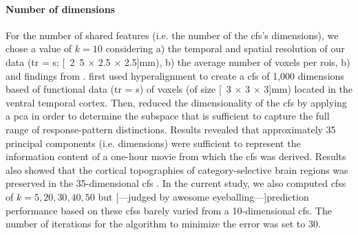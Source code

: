 \paragraph{Number of dimensions}


%
%

For the number of shared features (i.e. the number of the \ac{cfs}'s
dimensions), we chose a value of $k=10$ considering a) the temporal and spatial
resolution of our data (\ac{tr} = \unit[2]{s}; \unit[2.5 $\times$ 2.5 $\times$
2.5]{mm}), b) the average number of voxels per \acp{roi}, b) and findings from
\citet{haxby2011common}.
%
\citet{haxby2011common} first used hyperalignment to create a \ac{cfs} of 1,000
dimensions based of functional data (\ac{tr} = \unit[3]{s}) of voxels (of size
\unit[3 $\times$ 3 $\times$ 3]{mm}) located in the ventral temporal cortex.
%
Then, \citet{haxby2011common} reduced the dimensionality of the \ac{cfs} by
applying a \ac{pca} in order to determine the subspace that is sufficient to
capture the full range of response-pattern distinctions.
%
Results revealed that approximately 35 principal components (i.e. dimensions)
were sufficient to represent the information content of a one-hour movie from
which the \ac{cfs} was derived.
%
Results also showed that the cortical topographies of category-selective brain
regions was preserved in the 35-dimensional \ac{cfs} \citep{haxby2011common}.
%
In the current study, we also computed \acp{cfs} of $k=5, 20, 30, 40, 50$ but
[---judged by awesome eyeballing---]prediction performance based on these
\acp{cfs} barely varied from a 10-dimensional \ac{cfs}.
The number of iterations for the algorithm to minimize the error was set to 30.



